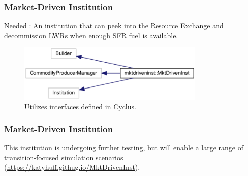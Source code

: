 \begin{frame}[fragile]
\frametitle{Market-Driven Institution}
Needed : An institution that can peek into the Resource Exchange and decommission LWRs when enough SFR fuel is available.
\begin{figure}[htbp!]
\begin{center}
\includegraphics[width=0.8\textwidth]{mdi_inherit}
\end{center}
\caption{Utilizes interfaces defined in Cyclus.}
\label{fig:mdi_inherit}
\end{figure}
\end{frame}

\begin{frame}[fragile]
\frametitle{Market-Driven Institution}
This institution is undergoing further testing, but will enable a large range 
of transition-focused simulation scenarios
(\url{https://katyhuff.githug.io/MktDrivenInst})\cite{huff_market_2014}.
\end{frame}

